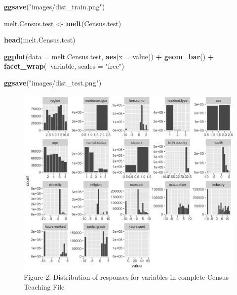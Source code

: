 \documentclass[]{book}
\newenvironment{Shaded}{\begin{snugshade}}{\end{snugshade}}
\newcommand{\KeywordTok}[1]{\textcolor[rgb]{0.13,0.29,0.53}{\textbf{#1}}}
\newcommand{\DataTypeTok}[1]{\textcolor[rgb]{0.13,0.29,0.53}{#1}}
\newcommand{\StringTok}[1]{\textcolor[rgb]{0.31,0.60,0.02}{#1}}
\newcommand{\OperatorTok}[1]{\textcolor[rgb]{0.81,0.36,0.00}{\textbf{#1}}}
\newcommand{\NormalTok}[1]{#1}
\begin{document}
\begin{Shaded}
\begin{Highlighting}[]
\KeywordTok{ggsave}\NormalTok{(}\StringTok{"images/dist_train.png"}\NormalTok{)}

\NormalTok{melt.Census.test <-}\StringTok{ }\KeywordTok{melt}\NormalTok{(Census.test)}

\KeywordTok{head}\NormalTok{(melt.Census.test)}

\KeywordTok{ggplot}\NormalTok{(}\DataTypeTok{data =}\NormalTok{ melt.Census.test, }\KeywordTok{aes}\NormalTok{(}\DataTypeTok{x =}\NormalTok{ value)) }\OperatorTok{+}
\StringTok{  }\KeywordTok{geom_bar}\NormalTok{() }\OperatorTok{+}
\StringTok{  }\KeywordTok{facet_wrap}\NormalTok{(}\OperatorTok{~}\NormalTok{variable, }\DataTypeTok{scales =} \StringTok{"free"}\NormalTok{)}

\KeywordTok{ggsave}\NormalTok{(}\StringTok{"images/dist_test.png"}\NormalTok{)}
\end{Highlighting}
\end{Shaded}

\begin{figure}
\centering
\includegraphics{images/dist_all.png}
\caption{Figure 2. Distribution of responses for variables in complete
Census Teaching File}
\end{figure}
\end{document}
